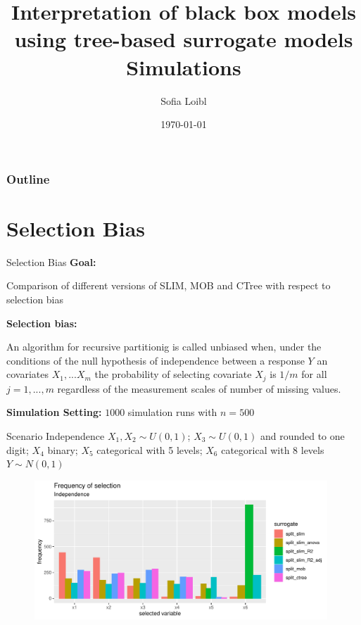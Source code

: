 \documentclass[9pt, xcolor=table]{beamer}
\title[Interpretation of black box models]{Interpretation of black box models using tree-based surrogate models \newline \small{Simulations}}
\author[Sofia Loibl]{Sofia Loibl}
\institute[LMU]{LMU München}
\date{\today}
\begin{document}
\begin{frame}
\titlepage 
\end{frame}


\begin{frame}
\frametitle{Outline} 
\tableofcontents 
\end{frame}

\section{Selection Bias}
\begin{frame}{Selection Bias}
\textbf{Goal:} 

Comparison of different versions of SLIM, MOB and CTree with respect to selection bias
\vspace{0.5cm}


\textbf{Selection bias:} 

An algorithm for recursive partitionig is called unbiased when, under the conditions of the null hypothesis of independence between a response $Y$ an covariates $X_{1},...X_{m}$ the probability of selecting covariate $X_{j}$ is $1/m$ for all $j = 1,...,m$ regardless of the measurement scales of number of missing values. \citep{Hothorn.2006}
\vspace{0.5cm}

\textbf{Simulation Setting:} $1000$ simulation runs with $n= 500$
\end{frame}


\begin{frame}{Scenario Independence}
$X_{1}, X_{2} \sim U(0,1)$; 
$X_{3} \sim U(0,1)$ and rounded to one digit;
$X_{4}$ binary;
$X_{5}$ categorical with 5 levels;
$X_{6}$ categorical with 8 levels\\
$Y \sim N(0,1)$

\begin{figure}
    \includegraphics[width=11cm]{Figures/Selection_Bias/independence_frequency.pdf}
\end{figure}
\end{frame}
\end{document}
